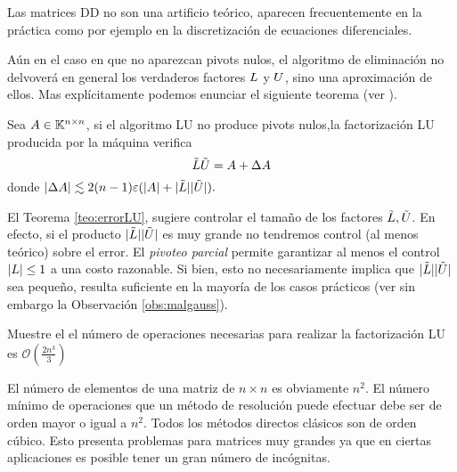 \begin{tcolorbox}
\begin{rem}
 Las matrices DD no son una artificio teórico, aparecen frecuentemente en la práctica como por ejemplo en la  discretización de ecuaciones diferenciales.
\end{rem}
\etcc

Aún en el caso en que no aparezcan pivots nulos, el algoritmo de eliminación no delvoverá en general los verdaderos factores $\Lb$ y $\Ub$, sino una aproximación de ellos. Mas explícitamente podemos enunciar el siguiente teorema (ver \cite{TB}).
\begin{tcolorbox}
[colback=black!15!white,colframe=black!75!black]
\begin{teo}\label{teo:errorLU}
 Sea $\Ab\in \Knn$,   si el algoritmo LU no produce pivots nulos,la factorización LU producida por la máquina verifica
 $$
 \tilde\Lb\tilde \Ub= \Ab + \Delta \Ab
 $$
donde $|\Delta\Ab|\lesssim 2(n-1)\varepsilon(| \Ab|+|\tilde \Lb||\tilde \Ub|).
$
\end{teo}

\end{tcolorbox}


\begin{tcolorbox}
\begin{rem}
 El Teorema \ref{teo:errorLU}, sugiere controlar el tamaño de los factores
$\tilde\Lb,\tilde\Ub$. En efecto, si el producto
$|\tilde \Lb||\tilde \Ub|$ es muy grande no tendremos control (al menos teórico) sobre el error. El \emph{pivoteo parcial} permite garantizar al menos el control $|\Lb|\le 1$ a una costo razonable. Si bien, esto no necesariamente implica que $|\tilde \Lb||\tilde \Ub|$ sea pequeño, resulta suficiente en la mayoría de los casos prácticos (ver sin embargo la Observación \ref{obs:malgauss}).

\end{rem}

\end{tcolorbox}


\begin{ej}
 Muestre el el número de operaciones necesarias para realizar la factorización LU es $\mathcal{O} (\frac{2n^3}{3})$
\end{ej}


El número de elementos de una matriz de $n\times n$ es obviamente $n^2$. El número mínimo de operaciones que un método de resolución puede efectuar debe ser de orden mayor o igual a $n^2$. Todos los métodos directos clásicos son de orden cúbico. Esto presenta problemas para matrices muy grandes ya que en ciertas aplicaciones es posible tener un gran número de incógnitas.


\end{tcolorbox}
